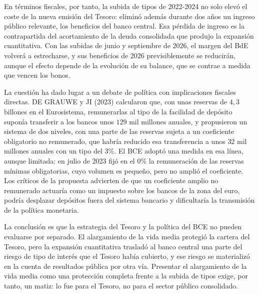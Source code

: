 \documentclass[10pt,a4paper]{article}
\begin{document}
En términos fiscales, por tanto, la subida de tipos de 2022-2024 no solo elevó el coste de la nueva emisión del Tesoro: eliminó además durante dos años un ingreso público relevante, los beneficios del banco central. Esa pérdida de ingreso es la contrapartida del acortamiento de la deuda consolidada que produjo la expansión cuantitativa. Con las subidas de junio y septiembre de 2026, el margen del BdE volverá a estrecharse, y sus beneficios de 2026 previsiblemente se reducirán, aunque el efecto depende de la evolución de su balance, que se contrae a medida que vencen los bonos.

La cuestión ha dado lugar a un debate de política con implicaciones fiscales directas. DE GRAUWE y JI (2023) calcularon que, con unas reservas de $4,3$ billones en el Eurosistema, remunerarlas al tipo de la facilidad de depósito suponía transferir a los bancos unos $129$ mil millones anuales, y propusieron un sistema de dos niveles, con una parte de las reservas sujeta a un coeficiente obligatorio no remunerado, que habría reducido esa transferencia a unos $32$ mil millones anuales con un tipo del $3\%$. El BCE adoptó una medida en esa línea, aunque limitada: en julio de 2023 fijó en el $0\%$ la remuneración de las reservas mínimas obligatorias, cuyo volumen es pequeño, pero no amplió el coeficiente. Los críticos de la propuesta advierten de que un coeficiente amplio no remunerado actuaría como un impuesto sobre los bancos de la zona del euro, podría desplazar depósitos fuera del sistema bancario y dificultaría la transmisión de la política monetaria.

La conclusión es que la estrategia del Tesoro y la política del BCE no pueden evaluarse por separado. El alargamiento de la vida media protegió la cartera del Tesoro, pero la expansión cuantitativa trasladó al banco central una parte del riesgo de tipo de interés que el Tesoro había cubierto, y ese riesgo se materializó en la cuenta de resultados pública por otra vía. Presentar el alargamiento de la vida media como una protección completa frente a la subida de tipos exige, por tanto, un matiz: lo fue para el Tesoro, no para el sector público consolidado.
\end{document}

